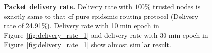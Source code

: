 \documentclass[11pt]{article}
\begin{document}
\begin{figure}[h!]
\center
{}
\hfill
{}
\caption{{\bf Packet delivery rate.} 
Delivery rate with $100\%$ trusted nodes is exactly same to that of pure epidemic routing protocol (Delivery rate of 24.91\%). 
Delivery rate with 10 min epoch in Figure~\ref{fig:delivery_rate_1} and delivery rate with 30 min epoch in Figure~\ref{fig:delivery_rate_1} show almost similar result. 
}
\label{fig:delivery_rate}
\end{figure}
\end{document}
